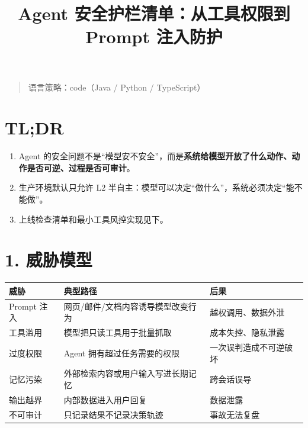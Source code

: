 \documentclass[9pt,a4paper,twocolumn]{ctexart}
\begin{document}
\title{Agent 安全护栏清单：从工具权限到 Prompt 注入防护}
\date{}
\maketitle
{}

\begin{quote}
语言策略：code（Java / Python / TypeScript）
\end{quote}



\section*{TL;DR}

\begin{enumerate}[itemsep=1pt, topsep=2pt]
  \item Agent 的安全问题不是“模型安不安全”，而是\textbf{系统给模型开放了什么动作、动作是否可逆、过程是否可审计}。
  \item 生产环境默认只允许 L2 半自主：模型可以决定“做什么”，系统必须决定“能不能做”。
  \item 上线检查清单和最小工具风控实现见下。
\end{enumerate}


\section*{1. 威胁模型}

{\footnotesize
\begin{tabular}{|p{}|p{}|p{}|}
\hline
\textbf{威胁} & \textbf{典型路径} & \textbf{后果} \\
\hline
Prompt 注入 & 网页/邮件/文档内容诱导模型改变行为 & 越权调用、数据外泄 \\
\hline
工具滥用 & 模型把只读工具用于批量抓取 & 成本失控、隐私泄露 \\
\hline
过度权限 & Agent 拥有超过任务需要的权限 & 一次误判造成不可逆破坏 \\
\hline
记忆污染 & 外部检索内容或用户输入写进长期记忆 & 跨会话误导 \\
\hline
输出越界 & 内部数据进入用户回复 & 数据泄露 \\
\hline
不可审计 & 只记录结果不记录决策轨迹 & 事故无法复盘 \\
\hline
\end{tabular}
}
\end{document}
